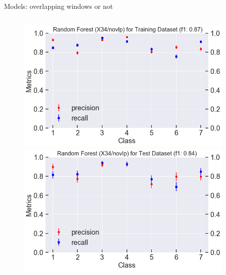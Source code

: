 \documentclass{if-beamer}
\begin{document}
\begin{frame}{Models: overlapping windows or not} 
    
    \begin{columns}
   \begin{column}{0.5\textwidth} 

            \begin{figure}
            \includegraphics[scale=0.2]{./figs/rf_X34_train_score.png}
            \includegraphics[scale=0.2]{./figs/rf_X34_test_score.png}
            \end{figure}
   \end{column} 
    
\begin{column}{0.5\textwidth}


\end{column}
\end{columns}
\end{frame}
\end{document}
